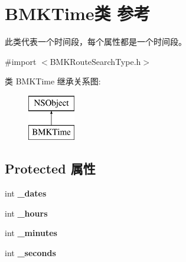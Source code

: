 \hypertarget{interface_b_m_k_time}{}\section{B\+M\+K\+Time类 参考}
\label{interface_b_m_k_time}


此类代表一个时间段，每个属性都是一个时间段。  




{\ttfamily \#import $<$B\+M\+K\+Route\+Search\+Type.\+h$>$}

类 B\+M\+K\+Time 继承关系图\+:\begin{figure}[H]
\begin{center}
\leavevmode
\includegraphics[height=2.000000cm]{interface_b_m_k_time}
\end{center}
\end{figure}
\subsection*{Protected 属性}
\begin{DoxyCompactItemize}
\item 
\hypertarget{interface_b_m_k_time_af301a1d5456265dd7e7de6e436b60e6f}{}int {\bfseries \+\_\+dates}\label{interface_b_m_k_time_af301a1d5456265dd7e7de6e436b60e6f}

\item 
\hypertarget{interface_b_m_k_time_a94fe70a1661e0d87a62aea5e8410b795}{}int {\bfseries \+\_\+hours}\label{interface_b_m_k_time_a94fe70a1661e0d87a62aea5e8410b795}

\item 
\hypertarget{interface_b_m_k_time_a9e7741ab7eed73e512d8c774e010dfc4}{}int {\bfseries \+\_\+minutes}\label{interface_b_m_k_time_a9e7741ab7eed73e512d8c774e010dfc4}

\item 
\hypertarget{interface_b_m_k_time_a398774b4d57bf197fff42a0503d607c7}{}int {\bfseries \+\_\+seconds}\label{interface_b_m_k_time_a398774b4d57bf197fff42a0503d607c7}

\end{DoxyCompactItemize}
